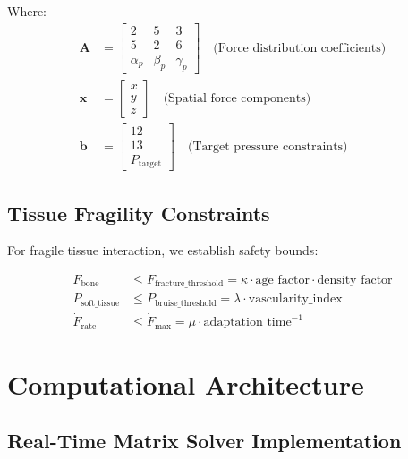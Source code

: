 \documentclass[11pt]{article}
\begin{document}
Where:
\begin{align}
\mathbf{A} &= \begin{bmatrix}
2 & 5 & 3 \\
5 & 2 & 6 \\
\alpha_p & \beta_p & \gamma_p
\end{bmatrix} \quad \text{(Force distribution coefficients)} \\
\mathbf{x} &= \begin{bmatrix} x \\ y \\ z \end{bmatrix} \quad \text{(Spatial force components)} \\
\mathbf{b} &= \begin{bmatrix} 12 \\ 13 \\ P_{\text{target}} \end{bmatrix} \quad \text{(Target pressure constraints)}
\end{align}

\subsection{Tissue Fragility Constraints}

For fragile tissue interaction, we establish safety bounds:

\begin{align}
F_{\text{bone}} &\leq F_{\text{fracture\_threshold}} = \kappa \cdot \text{age\_factor} \cdot \text{density\_factor} \\
P_{\text{soft\_tissue}} &\leq P_{\text{bruise\_threshold}} = \lambda \cdot \text{vascularity\_index} \\
\dot{F}_{\text{rate}} &\leq \dot{F}_{\text{max}} = \mu \cdot \text{adaptation\_time}^{-1}
\end{align}

\section{Computational Architecture}

\subsection{Real-Time Matrix Solver Implementation}
\end{document}
